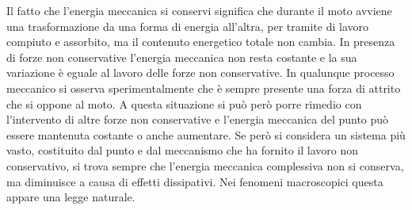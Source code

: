 \documentclass[10pt,a4paper]{book}
\begin{document}
Il fatto che l'energia meccanica si conservi significa che durante il moto avviene una trasformazione da una forma di energia all'altra, per tramite di lavoro compiuto e assorbito, ma il contenuto energetico totale non cambia.
In presenza di forze non conservative l'energia meccanica non resta costante e la sua variazione è eguale al lavoro delle forze non conservative. In qualunque processo meccanico si osserva sperimentalmente che è sempre presente una forza di attrito che si oppone al moto. A questa situazione si può però porre rimedio con l'intervento di altre forze non conservative e l'energia meccanica del punto può essere mantenuta costante o anche aumentare. Se però si considera un sistema più vasto, costituito dal punto e dal meccanismo che ha fornito il lavoro non conservativo, si trova sempre che l'energia meccanica complessiva non si conserva, ma diminuisce a causa di effetti dissipativi. Nei fenomeni macroscopici questa appare una legge naturale.
\end{document}

